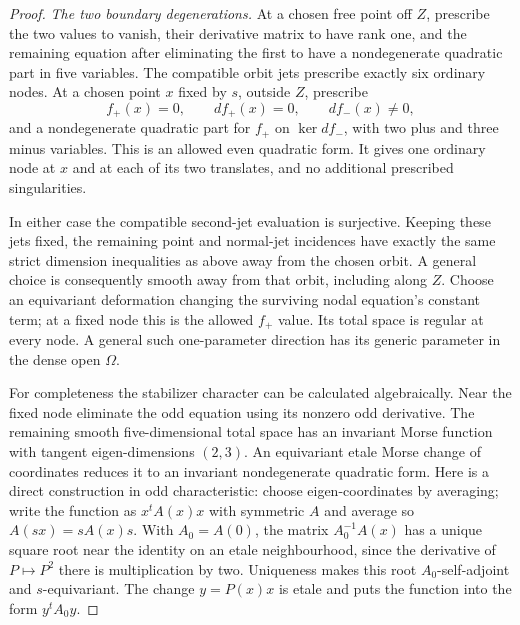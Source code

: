 \documentclass[11pt]{article}
\theoremstyle{remark}\newtheorem{remark}[theorem]{Remark}
\begin{document}
\begin{proof}
\emph{The two boundary degenerations.}
At a chosen free point off $Z$, prescribe the two
values to vanish, their derivative matrix to have
rank one, and the remaining equation after eliminating
the first to have a nondegenerate quadratic part in
five variables. The compatible orbit jets prescribe
exactly six ordinary nodes. At a chosen point $x$ fixed
by $s$, outside $Z$, prescribe
\[
      f_+(x)=0,\qquad df_+(x)=0,\qquad df_-(x)\ne0,
 \tag{A20.9}
\]
and a nondegenerate quadratic part for $f_+$ on
$\ker df_-$, with two plus and three minus variables.
This is an allowed even quadratic form. It gives one
ordinary node at $x$ and at each of its two translates,
and no additional prescribed singularities.

In either case the compatible second-jet evaluation
is surjective. Keeping these jets fixed, the remaining
point and normal-jet incidences have exactly the same
strict dimension inequalities as above away from the
chosen orbit. A general choice is consequently smooth
away from that orbit, including along $Z$. Choose an
equivariant deformation changing the surviving nodal
equation's constant term; at a fixed node this is the
allowed $f_+$ value. Its total space is regular at
every node. A general such one-parameter direction has
its generic parameter in the dense open $\Omega$.

For completeness the stabilizer character can be
calculated algebraically. Near the fixed node eliminate
the odd equation using its nonzero odd derivative.
The remaining smooth five-dimensional total space has
an invariant Morse function with tangent eigen-dimensions
$(2,3)$. An equivariant etale Morse change of coordinates
reduces it to an invariant nondegenerate quadratic form.
Here is a direct construction in odd characteristic:
choose eigen-coordinates by averaging; write the
function as $x^tA(x)x$ with symmetric $A$ and average
so $A(sx)=sA(x)s$. With $A_0=A(0)$, the matrix
$A_0^{-1}A(x)$ has a unique square root near the identity
on an etale neighbourhood, since the derivative of
$P\mapsto P^2$ there is multiplication by two.
Uniqueness makes this root $A_0$-self-adjoint and
$s$-equivariant. The change $y=P(x)x$ is etale and
puts the function into the form $y^tA_0y$.


\end{proof}
\end{document}

